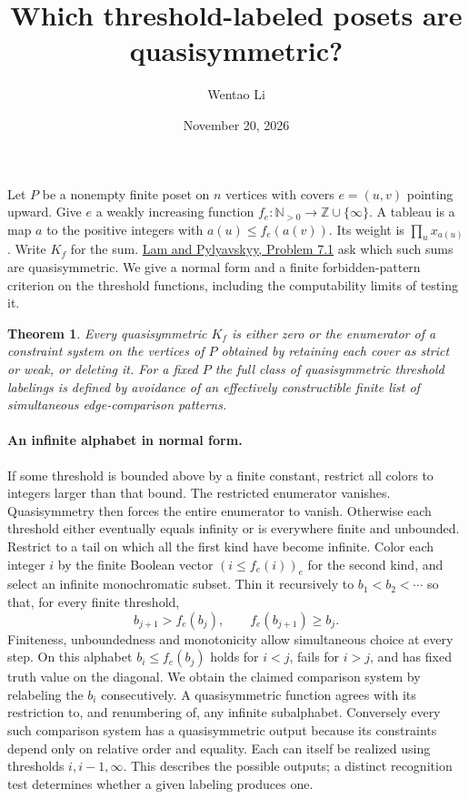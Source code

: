 \documentclass[11pt]{article}
\title{Which threshold-labeled posets are quasisymmetric?}
\author{Wentao Li}
\date{November 20, 2026}
\newtheorem{theorem}{Theorem}
\begin{document}
\maketitle

Let $P$ be a nonempty finite poset on $n$ vertices with covers $e=(u,v)$ pointing upward. Give $e$ a weakly increasing function $f_e:\mathbb N_{>0}\to\mathbb Z\cup\{\infty\}$. A tableau is a map $a$ to the positive integers with $a(u)\le f_e(a(v))$. Its weight is $\prod_u x_{a(u)}$. Write $K_f$ for the sum. \href{https://arxiv.org/abs/math/0609249}{Lam and Pylyavskyy, Problem 7.1} ask which such sums are quasisymmetric. We give a normal form and a finite forbidden-pattern criterion on the threshold functions, including the computability limits of testing it.

\begin{theorem}Every quasisymmetric $K_f$ is either zero or the enumerator of a constraint system on the vertices of $P$ obtained by retaining each cover as strict or weak, or deleting it. For a fixed $P$ the full class of quasisymmetric threshold labelings is defined by avoidance of an effectively constructible finite list of simultaneous edge-comparison patterns.\end{theorem}
\paragraph{An infinite alphabet in normal form.}
If some threshold is bounded above by a finite constant, restrict all colors to integers larger than that bound. The restricted enumerator vanishes. Quasisymmetry then forces the entire enumerator to vanish. Otherwise each threshold either eventually equals infinity or is everywhere finite and unbounded. Restrict to a tail on which all the first kind have become infinite. Color each integer $i$ by the finite Boolean vector $(i\le f_e(i))_e$ for the second kind, and select an infinite monochromatic subset. Thin it recursively to $b_1<b_2<\cdots$ so that, for every finite threshold,
\[
 b_{j+1}> f_e(b_j),\qquad f_e(b_{j+1})\ge b_j .
\]
Finiteness, unboundedness and monotonicity allow simultaneous choice at every step. On this alphabet $b_i\le f_e(b_j)$ holds for $i<j$, fails for $i>j$, and has fixed truth value on the diagonal. We obtain the claimed comparison system by relabeling the $b_i$ consecutively. A quasisymmetric function agrees with its restriction to, and renumbering of, any infinite subalphabet. Conversely every such comparison system has a quasisymmetric output because its constraints depend only on relative order and equality. Each can itself be realized using thresholds $i,i-1,\infty$. This describes the possible outputs; a distinct recognition test determines whether a given labeling produces one.
\end{document}
